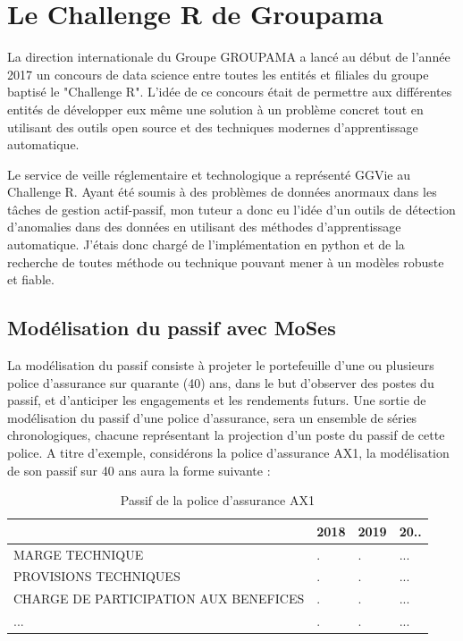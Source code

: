 \chapter{Le Challenge R de Groupama}

La direction internationale du Groupe GROUPAMA a lancé au début de l'année 2017 un concours de data science entre toutes les entités et filiales du groupe baptisé le "Challenge R". L'idée de ce concours était de permettre aux différentes entités de développer eux même une solution à un problème concret tout en utilisant des outils open source et des techniques modernes d'apprentissage automatique.

Le service de veille réglementaire et technologique a représenté GGVie au Challenge R. Ayant été soumis à des problèmes de données anormaux dans les tâches de gestion actif-passif, mon tuteur a donc eu l'idée d'un outils de détection d'anomalies dans des données en utilisant des méthodes d'apprentissage automatique. J'étais donc  chargé de l'implémentation en python et de la recherche de toutes méthode ou technique pouvant mener à un modèles robuste et fiable.

\section{Modélisation du passif avec MoSes}

La modélisation du passif consiste à projeter le portefeuille d'une ou plusieurs police d'assurance sur quarante (40) ans, dans le but d’observer des postes du passif, et d'anticiper les engagements et les rendements futurs.
Une sortie de modélisation du passif d'une police d'assurance, sera un ensemble de séries chronologiques, chacune représentant la projection d'un poste du passif de cette police. 
A titre d'exemple, considérons la police d'assurance AX1, la modélisation de son passif sur 40 ans aura la forme suivante : 
\begin{table}[H]
\centering
\caption{Passif de la police d'assurance \textsc{AX1}}
\label{my-label1}
\begin{tabular}{|l|l|l|l|}
\hline
    &  2018   &  2019   &  20..  \\ \hline
 MARGE TECHNIQUE   &  .   &   .  &  ...  \\ \hline
 PROVISIONS TECHNIQUES  &  .   &  .   &  ...  \\ \hline
 CHARGE DE PARTICIPATION AUX BENEFICES  &   .  &   .  &  ...  \\ \hline
  ...  &  .   &  .   &   ... \\ \hline
\end{tabular}
\end{table}

